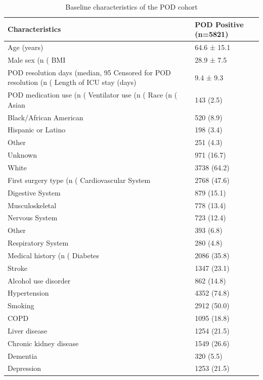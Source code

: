 \begin{table}

\caption{Baseline characteristics of the POD cohort}
\centering
\begin{tabular}[t]{ll}
\toprule
Characteristics & POD Positive (n=5821)\\
\midrule
Age (years) & 64.6 ± 15.1\\
Male sex (n (%
BMI & 28.9 ± 7.5\\
POD resolution days (median, 95%
Censored for POD resolution (n (%
\addlinespace
Length of ICU stay (days) & 9.4 ± 9.3\\
POD medication use (n (%
Ventilator use (n (%
Race (n (%
Asian & 143 (2.5)\\
\addlinespace
Black/African American & 520 (8.9)\\
Hispanic or Latino & 198 (3.4)\\
Other & 251 (4.3)\\
Unknown & 971 (16.7)\\
White & 3738 (64.2)\\
\addlinespace
First surgery type (n (%
Cardiovascular System & 2768 (47.6)\\
Digestive System & 879 (15.1)\\
Musculoskeletal & 778 (13.4)\\
Nervous System & 723 (12.4)\\
\addlinespace
Other & 393 (6.8)\\
Respiratory System & 280 (4.8)\\
Medical history (n (%
Diabetes & 2086 (35.8)\\
Stroke & 1347 (23.1)\\
\addlinespace
Alcohol use disorder & 862 (14.8)\\
Hypertension & 4352 (74.8)\\
Smoking & 2912 (50.0)\\
COPD & 1095 (18.8)\\
Liver disease & 1254 (21.5)\\
\addlinespace
Chronic kidney disease & 1549 (26.6)\\
Dementia & 320 (5.5)\\
Depression & 1253 (21.5)\\
\bottomrule
\end{tabular}
\end{table}
